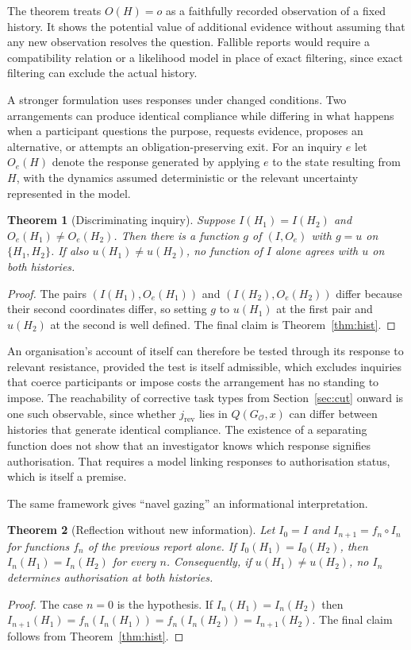 \documentclass[11pt]{article}
\newtheorem{theorem}{Theorem}
\theoremstyle{definition}
\theoremstyle{remark}
\begin{document}
The theorem treats $O(H)=o$ as a faithfully recorded observation of a fixed history. It shows the potential value of additional evidence without assuming that any new observation resolves the question. Fallible reports would require a compatibility relation or a likelihood model in place of exact filtering, since exact filtering can exclude the actual history.

A stronger formulation uses responses under changed conditions. Two arrangements can produce identical compliance while differing in what happens when a participant questions the purpose, requests evidence, proposes an alternative, or attempts an obligation-preserving exit. For an inquiry $e$ let $O_e(H)$ denote the response generated by applying $e$ to the state resulting from $H$, with the dynamics assumed deterministic or the relevant uncertainty represented in the model.

\begin{theorem}[Discriminating inquiry]\label{thm:inquiry}
Suppose $I(H_1)=I(H_2)$ and $O_e(H_1)\neq O_e(H_2)$. Then there is a function $g$ of $(I,O_e)$ with $g=u$ on $\{H_1,H_2\}$. If also $u(H_1)\neq u(H_2)$, no function of $I$ alone agrees with $u$ on both histories.
\end{theorem}
\begin{proof}
The pairs $(I(H_1),O_e(H_1))$ and $(I(H_2),O_e(H_2))$ differ because their second coordinates differ, so setting $g$ to $u(H_1)$ at the first pair and $u(H_2)$ at the second is well defined. The final claim is Theorem~\ref{thm:hist}. \qedhere
\end{proof}

An organisation's account of itself can therefore be tested through its response to relevant resistance, provided the test is itself admissible, which excludes inquiries that coerce participants or impose costs the arrangement has no standing to impose. The reachability of corrective task types from Section~\ref{sec:cut} onward is one such observable, since whether $j_{\mathrm{rev}}$ lies in $Q(G_{\mathcal O},x)$ can differ between histories that generate identical compliance. The existence of a separating function does not show that an investigator knows which response signifies authorisation. That requires a model linking responses to authorisation status, which is itself a premise.

The same framework gives ``navel gazing'' an informational interpretation.

\begin{theorem}[Reflection without new information]\label{thm:reflect}
Let $I_0=I$ and $I_{n+1}=f_n\circ I_n$ for functions $f_n$ of the previous report alone. If $I_0(H_1)=I_0(H_2)$, then $I_n(H_1)=I_n(H_2)$ for every $n$. Consequently, if $u(H_1)\neq u(H_2)$, no $I_n$ determines authorisation at both histories.
\end{theorem}
\begin{proof}
The case $n=0$ is the hypothesis. If $I_n(H_1)=I_n(H_2)$ then $I_{n+1}(H_1)=f_n(I_n(H_1))=f_n(I_n(H_2))=I_{n+1}(H_2)$. The final claim follows from Theorem~\ref{thm:hist}. \qedhere
\end{proof}
\end{document}
